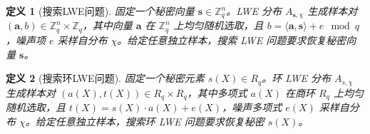 \documentclass[12pt,a4paper]{article}
\newtheorem{definition}{定义} %
\numberwithin{equation}{section}
\begin{document}

\begin{definition}[搜索LWE问题]
固定一个秘密向量 \(\mathbf{s} \in \mathbb{Z}_q^n\)。LWE 分布 \(A_{\mathbf{s},\chi}\) 生成样本对 \((\mathbf{a}, b) \in \mathbb{Z}_q^n \times \mathbb{Z}_q\)，其中向量 \(\mathbf{a}\) 在 \(\mathbb{Z}_q^n\) 上均匀随机选取，且 \(b = \langle \mathbf{a}, \mathbf{s} \rangle + e \mod q\)，噪声项 \(e\) 采样自分布 \(\chi\)。给定任意独立样本，搜索 LWE 问题要求恢复秘密向量 \(\mathbf{s}\)。
\end{definition}

\begin{definition}[搜索环LWE问题]
固定一个秘密元素 \(s(X) \in R_q\)。环 LWE 分布 \(A_{s,\chi}\) 生成样本对 \((a(X), t(X)) \in R_q \times R_q\)，其中多项式 \(a(X)\) 在商环 \(R_q\) 上均匀随机选取，且 \(t(X) = s(X) \cdot a(X) + e(X)\)，噪声多项式 \(e(X)\) 采样自分布 \(\chi\)。给定任意独立样本，搜索环 LWE 问题要求恢复秘密 \(s(X)\)。
\end{definition}

\end{document}
